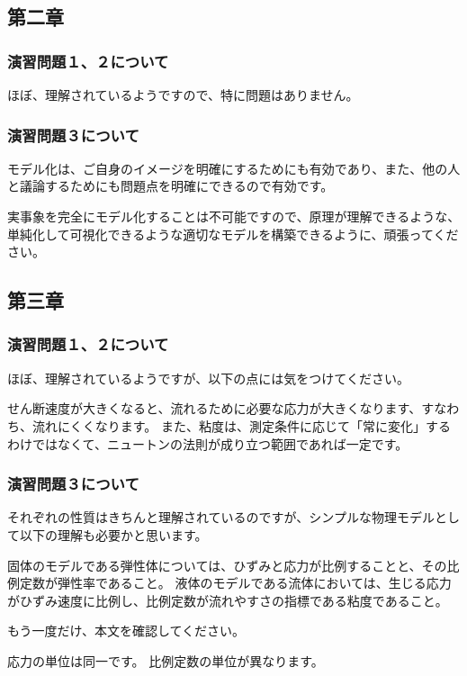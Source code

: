 \documentclass[uplatex,dvipdfmx,a4paper,11pt]{jsreport}
\begin{document}
\subsection*{第二章}
\subsubsection*{演習問題１、２について}
ほぼ、理解されているようですので、特に問題はありません。

\subsubsection*{演習問題３について}

モデル化は、ご自身のイメージを明確にするためにも有効であり、また、他の人と議論するためにも問題点を明確にできるので有効です。

実事象を完全にモデル化することは不可能ですので、原理が理解できるような、単純化して可視化できるような適切なモデルを構築できるように、頑張ってください。

\subsection*{第三章}
\subsubsection*{演習問題１、２について}
ほぼ、理解されているようですが、以下の点には気をつけてください。

せん断速度が大きくなると、流れるために必要な応力が大きくなります、すなわち、流れにくくなります。
また、粘度は、測定条件に応じて「常に変化」するわけではなくて、ニュートンの法則が成り立つ範囲であれば一定です。

\subsubsection*{演習問題３について}
それぞれの性質はきちんと理解されているのですが、シンプルな物理モデルとして以下の理解も必要かと思います。

固体のモデルである弾性体については、ひずみと応力が比例することと、その比例定数が弾性率であること。
液体のモデルである流体においては、生じる応力がひずみ速度に比例し、比例定数が流れやすさの指標である粘度であること。

もう一度だけ、本文を確認してください。

応力の単位は同一です。
比例定数の単位が異なります。
\clearpage
\end{document}
